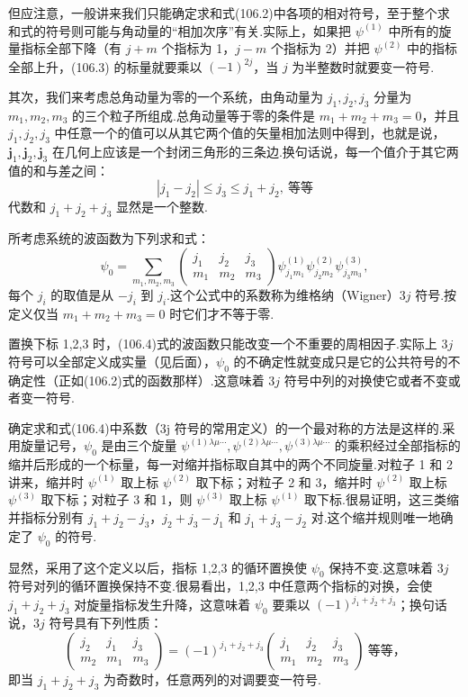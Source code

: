 但应注意，一般讲来我们只能确定求和式(106.2)中各项的相对符号，至于整个求和式的符号则可能与角动量的“相加次序”有关.实际上，如果把 $\psi^{(1)}$ 中所有的旋量指标全部下降（有 $j+m$ 个指标为 1，$j-m$ 个指标为 2）并把 $\psi^{(2)}$ 中的指标全部上升，(106.3) 的标量就要乘以 $(-1)^{2j}$，当 $j$ 为半整数时就要变一符号.

其次，我们来考虑总角动量为零的一个系统，由角动量为 $j_1,j_2,j_3$ 分量为 $m_1,m_2,m_3$ 的三个粒子所组成.总角动量等于零的条件是 $m_1+m_2+m_3=0$，并且 $j_1,j_2,j_3$ 中任意一个的值可以从其它两个值的矢量相加法则中得到，也就是说，$\boldsymbol{j}_1,\boldsymbol{j}_2,\boldsymbol{j}_3$ 在几何上应该是一个封闭三角形的三条边.换句话说，每一个值介于其它两值的和与差之间：
\begin{equation*}
  |j_1-j_2|\leqslant j_3\leqslant j_1+j_2,\ \text{等等}
\end{equation*}
代数和 $j_1+j_2+j_3$ 显然是一个整数.

所考虑系统的波函数为下列求和式：
\begin{equation}
  \psi_0=\sum_{m_1,m_2,m_3}
  \left(\begin{array}{ccc}j_1&j_2&j_3\\m_1&m_2&m_3\end{array}\right)
  \psi^{(1)}_{j_1m_1}\psi^{(2)}_{j_2m_2}\psi^{(3)}_{j_3m_3},
\end{equation}
每个 $j_i$ 的取值是从 $-j_i$ 到 $j_i$.这个公式中的系数称为维格纳（Wigner）$3j$ 符号.按定义仅当 $m_1+m_2+m_3=0$ 时它们才不等于零.

置换下标 1,2,3 时，(106.4)式的波函数只能改变一个不重要的周相因子.实际上 $3j$ 符号可以全部定义成实量（见后面），$\psi_0$ 的不确定性就变成只是它的公共符号的不确定性（正如(106.2)式的函数那样）.这意味着 $3j$ 符号中列的对换使它或者不变或者变一符号.

确定求和式(106.4)中系数（3j 符号的常用定义）的一个最对称的方法是这样的.采用旋量记号，$\psi_0$ 是由三个旋量 $\psi^{(1)\lambda\mu\cdots},\psi^{(2)\lambda\mu\cdots},\psi^{(3)\lambda\mu\cdots}$ 的乘积经过全部指标的缩并后形成的一个标量，每一对缩并指标取自其中的两个不同旋量.对粒子 1 和 2 讲来，缩并时 $\psi^{(1)}$ 取上标 $\psi^{(2)}$ 取下标；对粒子 2 和 3，缩并时 $\psi^{(2)}$ 取上标 $\psi^{(3)}$ 取下标；对粒子 3 和 1，则 $\psi^{(3)}$ 取上标 $\psi^{(1)}$ 取下标.很易证明，这三类缩并指标分别有 $j_1+j_2-j_3$，$j_2+j_3-j_1$ 和 $j_1+j_3-j_2$ 对.这个缩并规则唯一地确定了 $\psi_0$ 的符号.

显然，采用了这个定义以后，指标 1,2,3 的循环置换使 $\psi_0$ 保持不变.这意味着 $3j$ 符号对列的循环置换保持不变.很易看出，1,2,3 中任意两个指标的对换，会使 $j_1+j_2+j_3$ 对旋量指标发生升降，这意味着 $\psi_0$ 要乘以 $(-1)^{j_1+j_2+j_3}$；换句话说，$3j$ 符号具有下列性质：
\begin{equation}
  \left(\begin{array}{ccc}j_2&j_1&j_3\\m_2&m_1&m_3\end{array}\right)
  =(-1)^{j_1+j_2+j_3}
  \left(\begin{array}{ccc}j_1&j_2&j_3\\m_1&m_2&m_3\end{array}\right)\ \text{等等，}
\end{equation}
即当 $j_1+j_2+j_3$ 为奇数时，任意两列的对调要变一符号.

